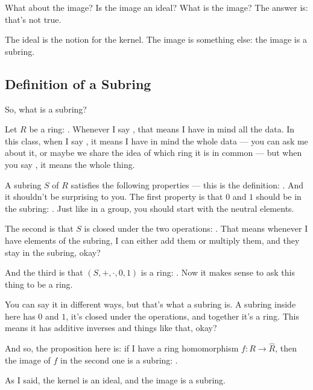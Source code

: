 \begin{speech}[00:35:06 - 00:36:04]
What about the image? Is the image an ideal? What is the image? The answer is: that's not true.

The ideal is the notion for the kernel. The image is something else: the image is a subring.
\end{speech}

\subsection{Definition of a Subring}

\begin{speech}[00:36:04 - 00:38:17]
So, what is a subring?

Let $R$ be a ring: . Whenever I say , that means I have in mind all the data. In this class, when I say , it means I have in mind the whole data --- you can ask me about it, or maybe we share the idea of which ring it is in common --- but when you say , it means the whole thing.

A subring $S$ of $R$ satisfies the following properties --- this is the definition: . And it shouldn't be surprising to you. The first property is that $0$ and $1$ should be in the subring: . Just like in a group, you should start with the neutral elements.

The second is that $S$ is closed under the two operations: . That means whenever I have elements of the subring, I can either add them or multiply them, and they stay in the subring, okay?

And the third is that $(S, +, \cdot, 0, 1)$ is a ring: . Now it makes sense to ask this thing to be a ring.

You can say it in different ways, but that's what a subring is. A subring inside here has $0$ and $1$, it's closed under the operations, and together it's a ring. This means it has additive inverses and things like that, okay?

And so, the proposition here is:  if I have a ring homomorphism $f \colon R \to \hat{R}$,  then the image of $f$ in the second one is a subring: .

As I said, the kernel is an ideal, and the image is a subring.
\end{speech}

